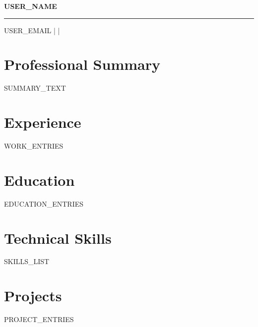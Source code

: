 \documentclass[11pt,a4paper]{article}
\begin{document}
\begin{center}
{\Huge\color{accentcolor}\bfseries {{USER_NAME}}}
\vspace{0.5em}
\hrule
\vspace{0.3em}
{\small {{USER_EMAIL}} \quad |  \quad | }
\end{center}

\vspace{0.8em}

\section*{Professional Summary}
{{SUMMARY_TEXT}}

\vspace{0.5em}

\section*{Experience}
{{WORK_ENTRIES}}

\vspace{0.5em}

\section*{Education}
{{EDUCATION_ENTRIES}}

\vspace{0.5em}

\section*{Technical Skills}
{{SKILLS_LIST}}

\vspace{0.5em}

\section*{Projects}
{{PROJECT_ENTRIES}}
\end{document}
